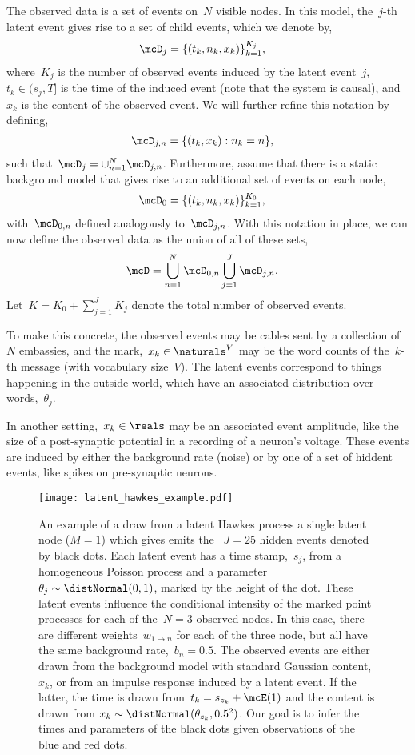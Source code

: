 The observed data is a set of events on~$N$ visible nodes.
In this model, the~$j$-th latent event gives rise to a set of child
events, which we denote by,
\begin{align}
  \mcD_j &= \{(t_k, n_k, x_k)\}_{k=1}^{K_j},
\end{align}
where~$K_j$ is the number of observed events induced by the latent
event~$j$,~$t_k \in (s_j,T]$ is the time of the induced event (note
that the system is causal), and~$x_k$ is the content of the observed
event. We will further refine this notation by defining,
\begin{align}
  \mcD_{j,n} &= \{(t_k, x_k): n_k = n\},
\end{align}
such that~$\mcD_j = \cup_{n=1}^N \mcD_{j,n}$.
Furthermore, assume that there is a static background model
that gives rise to an additional set of events on each node,
\begin{align}
 \mcD_0 &= \{(t_k, n_k, x_k)\}_{k=1}^{K_0},
\end{align}
with~$\mcD_{0,n}$ defined analogously to~$\mcD_{j,n}$. With this
notation in place, we can now define the observed data as
the union of all of these sets,
\begin{align}
  \mcD &= \bigcup_{n=1}^N \mcD_{0,n} \bigcup_{j=1}^J \mcD_{j,n}.
\end{align}
Let~$K=K_0 + \sum_{j=1}^J K_j$ denote the total number of observed events.

To make this concrete, the observed events may be cables sent by a
collection of~$N$ embassies, and the mark,~$x_k \in \naturals^V$ may
be the word counts of the~$k$-th message (with vocabulary
size~$V$). The latent events correspond to things happening in the
outside world, which have an associated distribution over
words,~$\theta_j$.

In another setting,~$x_k \in \reals$ may be an associated event
amplitude, like the size of a post-synaptic potential in a recording
of a neuron's voltage. These events are induced by either the
background rate (noise) or by one of a set of hiddent events, like
spikes on pre-synaptic neurons.

\begin{figure}[t!]
\texttt{[image: latent\_hawkes\_example.pdf]}
\caption{An example of a draw from a latent Hawkes process
a single latent node ($M=1$) which gives emits the ~$J=25$ hidden
events denoted by black dots. Each latent event has a time
stamp,~$s_j$, from a homogeneous Poisson process and a
parameter~$\theta_j \sim \distNormal(0,1)$, marked by the height of
the dot. These latent events influence the conditional intensity of
the marked point processes for each of the~$N=3$ observed nodes. In
this case, there are different weights~$w_{1 \to n}$ for each of the
three node, but all have the same background rate,~$b_n=0.5$. The
observed events are either drawn from the background model with
standard Gaussian content,~$x_k$, or from an impulse response induced
by a latent event. If the latter, the time is drawn from~$t_k =
s_{z_k} + \mcE(1)$ and the content is drawn from
$x_k \sim \distNormal(\theta_{z_k}, 0.5^2)$. Our goal is to infer the
times and parameters of the black dots given observations of the blue
and red dots.}
\end{figure}

